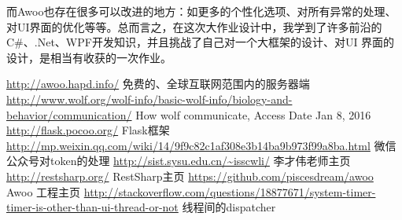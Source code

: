 \documentclass[a4paper,11pt]{article}
\begin{document}
    而Awoo也存在很多可以改进的地方：如更多的个性化选项、对所有异常的处理、对UI界面的优化等等。总而言之，在这次大作业设计中，我学到了许多前沿的C\#、.Net、WPF开发知识，并且挑战了自己对一个大框架的设计、对UI 界面的设计，是相当有收获的一次作业。


\clearpage
\renewcommand\refname{参考文献}
\begin{thebibliography}{99}
     \url{http://awoo.hapd.info/} 免费的、全球互联网范围内的服务器端
     \url{http://www.wolf.org/wolf-info/basic-wolf-info/biology-and-behavior/communication/} How wolf communicate, Access Date Jan 8, 2016
     \url{http://flask.pocoo.org/} Flask框架
     \url{http://mp.weixin.qq.com/wiki/14/9f9c82c1af308e3b14ba9b973f99a8ba.html} 微信公众号对token的处理
     \url{http://sist.sysu.edu.cn/~isscwli/} 李才伟老师主页
     \url{http://restsharp.org/} RestSharp主页
     \url{https://github.com/piscesdream/awoo} Awoo 工程主页
     \url{http://stackoverflow.com/questions/18877671/system-timer-timer-is-other-than-ui-thread-or-not} 线程间的dispatcher
\end{thebibliography}
\end{document}

